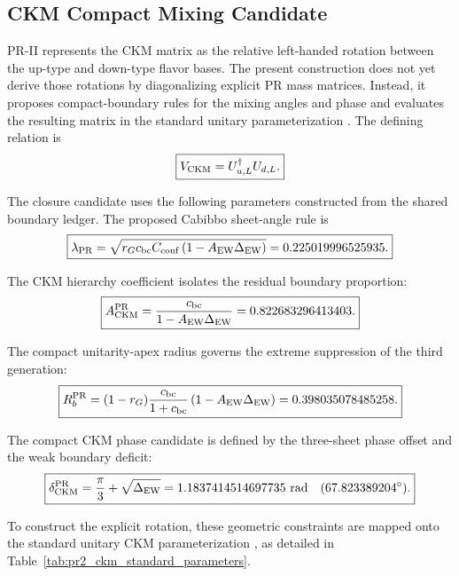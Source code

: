 \documentclass[11pt]{article}
\begin{document}
\subsection{CKM Compact Mixing Candidate}
\label{sec:pr2_ckm_compact_mixing_candidate}

PR-II represents the CKM matrix as the relative left-handed rotation between the up-type and down-type flavor bases. The present construction does not yet derive those rotations by diagonalizing explicit PR mass matrices. Instead, it proposes compact-boundary rules for the mixing angles and phase and evaluates the resulting matrix in the standard unitary parameterization \cite{Cabibbo1963,ChauKeung1984}. The defining relation is
\begin{equation}
\boxed{
V_{\rm CKM}
=
U_{u,L}^{\dagger}U_{d,L}.
}
\end{equation}

The closure candidate uses the following parameters constructed from the shared boundary ledger. The proposed Cabibbo sheet-angle rule is
\begin{equation}
\boxed{
\lambda_{\rm PR}
=
\sqrt{
r_Gc_{\rm bc}C_{\rm conf}
\left(
1-A_{\rm EW}\Delta_{\rm EW}
\right)
}
=
0.225019996525935.
}
\end{equation}

The CKM hierarchy coefficient isolates the residual boundary proportion:
\begin{equation}
\boxed{
A_{\rm CKM}^{\rm PR}
=
\frac{
c_{\rm bc}
}{
1-A_{\rm EW}\Delta_{\rm EW}
}
=
0.822683296413403.
}
\end{equation}

The compact unitarity-apex radius governs the extreme suppression of the third generation:
\begin{equation}
\boxed{
R_b^{\rm PR}
=
(1-r_G)
\frac{c_{\rm bc}}{1+c_{\rm bc}}
\left(
1-A_{\rm EW}\Delta_{\rm EW}
\right)
=
0.398035078485258.
}
\end{equation}

The compact CKM phase candidate is defined by the three-sheet phase offset and the weak boundary deficit:
\begin{equation}
\boxed{
\delta_{\rm CKM}^{\rm PR}
=
\frac{\pi}{3}
+
\sqrt{\Delta_{\rm EW}}
=
1.1837414514697735\ {\rm rad}
\quad
(67.823389204^\circ).
}
\end{equation}

To construct the explicit rotation, these geometric constraints are mapped onto the standard unitary CKM parameterization \cite{ChauKeung1984}, as detailed in Table~\ref{tab:pr2_ckm_standard_parameters}.
\end{document}
